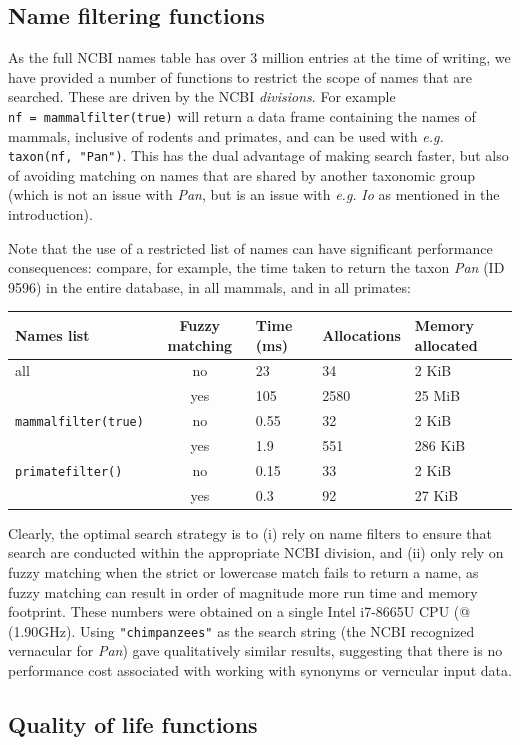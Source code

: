 \documentclass[10pt,oneside]{article}
\begin{document}
\hypertarget{name-filtering-functions}{%
\subsection{Name filtering functions}\label{name-filtering-functions}}

As the full NCBI names table has over 3 million entries at the time of
writing, we have provided a number of functions to restrict the scope of
names that are searched. These are driven by the NCBI \emph{divisions}.
For example \texttt{nf\ =\ mammalfilter(true)} will return a data frame
containing the names of mammals, inclusive of rodents and primates, and
can be used with \emph{e.g.} \texttt{taxon(nf,\ "Pan")}. This has the
dual advantage of making search faster, but also of avoiding matching on
names that are shared by another taxonomic group (which is not an issue
with \emph{Pan}, but is an issue with \emph{e.g.} \emph{Io} as mentioned
in the introduction).

Note that the use of a restricted list of names can have significant
performance consequences: compare, for example, the time taken to return
the taxon \emph{Pan} (ID 9596) in the entire database, in all mammals,
and in all primates:

\begin{longtable}[]{@{}lclll@{}}
\toprule
Names list & Fuzzy matching & Time (ms) & Allocations & Memory
allocated\tabularnewline
\midrule
\endhead
all & no & 23 & 34 & 2 KiB\tabularnewline
& yes & 105 & 2580 & 25 MiB\tabularnewline
\texttt{mammalfilter(true)} & no & 0.55 & 32 & 2 KiB\tabularnewline
& yes & 1.9 & 551 & 286 KiB\tabularnewline
\texttt{primatefilter()} & no & 0.15 & 33 & 2 KiB\tabularnewline
& yes & 0.3 & 92 & 27 KiB\tabularnewline
\bottomrule
\end{longtable}

Clearly, the optimal search strategy is to (i) rely on name filters to
ensure that search are conducted within the appropriate NCBI division,
and (ii) only rely on fuzzy matching when the strict or lowercase match
fails to return a name, as fuzzy matching can result in order of
magnitude more run time and memory footprint. These numbers were
obtained on a single Intel i7-8665U CPU (@ (1.90GHz). Using
\texttt{"chimpanzees"} as the search string (the NCBI recognized
vernacular for \emph{Pan}) gave qualitatively similar results,
suggesting that there is no performance cost associated with working
with synonyms or verncular input data.

\hypertarget{quality-of-life-functions}{%
\subsection{Quality of life functions}\label{quality-of-life-functions}}
\end{document}

